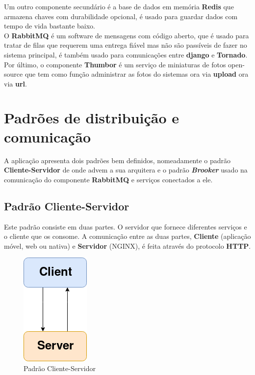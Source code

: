 \documentclass[11pt,a4paper]{report}%
\begin{document}
Um outro componente secundário é a base de dados em memória \textbf{Redis} que armazena chaves com durabilidade opcional, é usado para guardar dados com tempo de vida bastante baixo.\\ O \textbf{RabbitMQ} é um software de mensagens com código aberto, que é usado para tratar de filas que requerem uma entrega fiável mas não são passíveis de fazer no sistema principal, é também usado para comunicações entre \textbf{django} e \textbf{Tornado}.\\ Por último, o componente \textbf{Thumbor} é um serviço de miniaturas de fotos open-source que tem como função administrar as fotos do sistemas ora via \textbf{upload} ora via \textbf{url}. 


\chapter{Padrões de distribuição e comunicação}

A aplicação apresenta dois padrões bem definidos, nomeadamente o padrão \textbf{Cliente-Servidor} de onde advem a sua arquitera e o padrão \textbf{\textit{Brooker}} usado na comunicação do componente \textbf{RabbitMQ} e serviços conectados a ele.

\section{Padrão Cliente-Servidor}

Este padrão consiste em duas partes. O servidor que fornece diferentes serviços e o cliente que os consome. A comunicação entre as duas partes, \textbf{Cliente} (aplicação móvel, web ou nativa) e \textbf{Servidor} (NGINX), é feita através do protocolo \textbf{HTTP}.

\begin{figure}[H]
	\centering
	\includegraphics[scale=0.50]{client_server.png}
	\caption{Padrão Cliente-Servidor}
	\label{img:cliente-servidor}
\end{figure}
\end{document}
